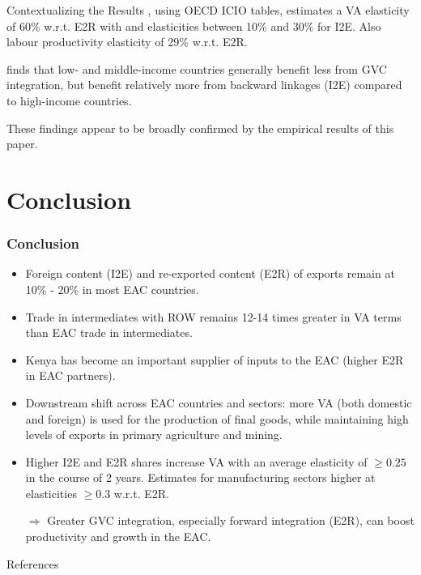 \documentclass[compress]{beamer}
\newenvironment{noheadline}{
    \setbeamertemplate{headline}{}
    \addtobeamertemplate{frametitle}{\vspace*{-0.9\baselineskip}}{}
}{}
\begin{document}
\begin{frame}{Contextualizing the Results}
\citet{Kummritz20161}, using OECD ICIO tables, estimates a VA elasticity of 60\% w.r.t. E2R with and elasticities between 10\% and 30\% for I2E. Also labour productivity elasticity of 29\% w.r.t. E2R. \newline 


\citet{kummritz2015global} finds that low- and middle-income countries generally benefit less from GVC integration, but benefit relatively more from backward linkages (I2E) compared to high-income countries. \newline

These findings appear to be broadly confirmed by the empirical results of this paper.
\end{frame}

\section{Conclusion}

\begin{noheadline}
\begin{frame}
\frametitle{Conclusion}
\begin{itemize} \setlength{\itemsep}{0.5em}
\item Foreign content (I2E) and re-exported content (E2R) of exports remain at 10\% - 20\% in most EAC countries. 

\item Trade in intermediates with ROW remains 12-14 times greater in VA terms than EAC trade in intermediates. 

\item Kenya has become an important supplier of inputs to the EAC (higher E2R in EAC partners). 

\item Downstream shift across EAC countries and sectors: more VA (both domestic and foreign) is used for the production of final goods, while maintaining high levels of exports in primary agriculture and mining.

\item Higher I2E and E2R shares increase VA with an average elasticity of $\geq 0.25$ in the course of 2 years. Estimates for manufacturing sectors higher at elasticities $\geq 0.3$ w.r.t. E2R. 
\item[$\Rightarrow$] Greater GVC integration, especially forward integration (E2R), can boost productivity and growth in the EAC.
\end{itemize}
\end{frame}

\begin{frame}{References}
\tiny


\end{frame}
\end{noheadline}
\end{document}
